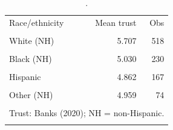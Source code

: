 \begin{table}[htbp]\centering
\caption{.}
\label{tab:trust_mean_by_race_eth_banks_2020}
\begin{tabular}{lrr}\toprule
Race/ethnicity & Mean trust & Obs \\\\ \midrule
White (NH) & 5.707 & 518 \\\\
Black (NH) & 5.030 & 230 \\\\
Hispanic & 4.862 & 167 \\\\
Other (NH) & 4.959 & 74 \\\\
\bottomrule
\multicolumn{3}{l}{\footnotesize Trust: Banks (2020); NH = non-Hispanic.} \\\\
\end{tabular}
\end{table}
